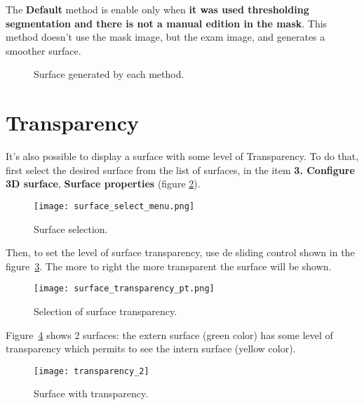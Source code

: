The \textbf{Default} method is enable only when \textbf{it was used thresholding segmentation and there is not a manual edition in the mask}. This method doesn't use the mask image, but the exam image, and generates a smoother surface.

\begin{figure}[!htb]
  \centering
  \hfill
  \hfill
  \caption{Surface generated by each method.}
  \label{fig:surf_method}
\end{figure}

\section{Transparency}

It's also possible to display a surface with some level of Transparency. To do that, first select the desired surface from the list of surfaces, in the item \textbf{3. Configure 3D surface}, \textbf{Surface properties} (figure \ref{fig:select_surface}).

\begin{figure}[!htb]
\centering
\texttt{[image: surface\_select\_menu.png]}
\caption{Surface selection.}
\label{fig:select_surface}
\end{figure}

Then, to set the level of surface transparency, use de sliding control shown in the figure~\ref{fig:select_transparency}. The more to right the more transparent the surface will be shown.

\begin{figure}[!htb]
\centering
\texttt{[image: surface\_transparency\_pt.png]}
\caption{Selection of surface transparency.}
\label{fig:select_transparency}
\end{figure}

Figure~\ref{fig:model_transparency} shows 2 surfaces: the extern surface (green color) has some level of transparency which permits to see the intern surface (yellow color).

\begin{figure}[!htb]
\centering
\texttt{[image: transparency\_2]}
\caption{Surface with transparency.}
\label{fig:model_transparency}
\end{figure}

